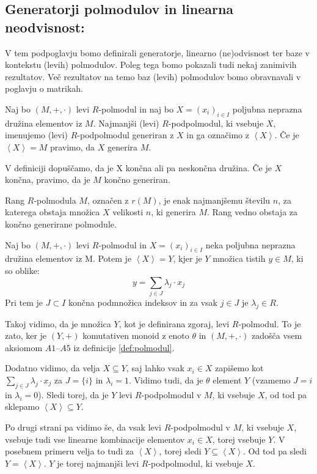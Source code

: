 \documentclass[mat1]{fmfdelo}
\newcommand{\Gen}[1]{\ensuremath{\left<{#1}\right>}}
\begin{document}
\subsection{Generatorji polmodulov in linearna neodvisnost:}
V tem podpoglavju bomo definirali generatorje, linearno (ne)odvisnost ter baze v kontekstu (levih) polmodulov. Poleg tega bomo pokazali tudi nekaj zanimivih rezultatov. Več rezultatov na temo baz (levih) polmodulov bomo obravnavali v poglavju o matrikah.
\begin{definicija}
	Naj bo $(M, +, \cdot)$ levi $R$-polmodul in naj bo $X = (x_i)_{i\in I}$ poljubna neprazna družina elementov iz $M$. Najmanjši (levi) $R$-podpolmodul, ki vsebuje $X$, imenujemo (levi) $R$-podpolmodul generiran z $X$ in ga označimo z \Gen{X}. Če je $\Gen{X} = M$ pravimo, da $X$ generira $M$.
\end{definicija}

\begin{opomba}
	V definiciji dopuščamo, da je X končna ali pa neskončna družina. Če je $X$ končna, pravimo, da je $M$ končno generiran.
\end{opomba}

\begin{definicija}
	Rang $R$-polmodula $M$, označen z $r(M)$, je enak najmanjšemu številu $n$, za katerega obstaja množica $X$ velikosti $n$, ki generira $M$. Rang vedno obstaja za končno generirane polmodule.
\end{definicija}

\begin{trditev}
	Naj bo $(M, +, \cdot)$ levi $R$-polmodul in $X = (x_i)_{i\in I}$ neka poljubna neprazna družina elementov iz M. Potem je $\Gen{X} = Y$, kjer je $Y$  množica tistih $y\in M$, ki so oblike: $$ y = \sum_{j\in J} \lambda_j \cdot x_j$$ Pri tem je $J\subset I$ končna podmnožica indeksov in za vsak $j\in J$ je $\lambda_j \in R$.
\end{trditev}

\begin{dokaz}
	
	Takoj vidimo, da je množica $Y$, kot je definirana zgoraj, levi $R$-polmodul. To je zato, ker je $(Y, +)$ komutativen monoid z enoto $\theta$ in $(M, +, \cdot)$ zadošča vsem aksiomom $A1$--$A5$ iz definicije \ref{def:polmodul}.
	
	Dodatno vidimo, da velja $X \subseteq Y$, saj lahko vsak $x_i\in X$ zapišemo kot $\sum_{j\in J}\lambda_j\cdot x_j$ za $J = \{i\}$ in $\lambda_i = 1$. Vidimo tudi, da je $\theta$ element $Y$ (vzamemo $J = {i}$ in $\lambda_i = 0$). Sledi torej, da je $Y$ levi $R$-podpolmodul v $M$, ki vsebuje $X$, od tod pa sklepamo $\Gen{X} \subseteq Y$. 
	
	Po drugi strani pa vidimo še, da vsak levi $R$-podpolmodul v $M$, ki vsebuje $X$, vsebuje tudi vse linearne kombinacije elementov $x_i\in X$, torej vsebuje $Y$. V posebnem primeru velja to tudi za \Gen{X}, torej sledi $Y \subseteq \Gen{X}$. Od tod pa sledi $Y = \Gen{X}$. $Y$ je torej najmanjši levi $R$-podpolmodul, ki vsebuje $X$.
\end{dokaz}
\end{document}
